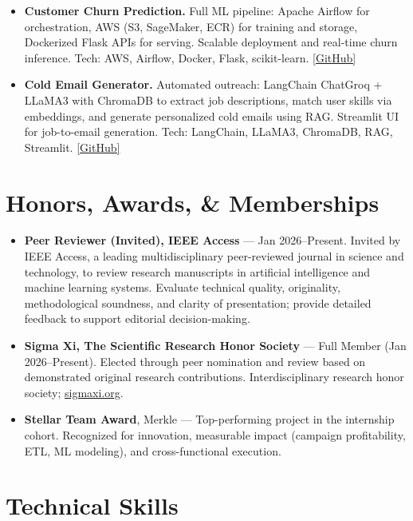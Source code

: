 \documentclass[11pt,a4paper]{article}
\newcommand{\cvItem}[1]{\item \small #1 \vspace{-1pt}}
\begin{document}
\begin{itemize}[leftmargin=*,nosep]
  \cvItem{\textbf{Customer Churn Prediction.} Full ML pipeline: Apache Airflow for orchestration, AWS (S3, SageMaker, ECR) for training and storage, Dockerized Flask APIs for serving. Scalable deployment and real-time churn inference. Tech: AWS, Airflow, Docker, Flask, scikit-learn. \href{https://github.com/aravinda-1402/Customer-Churn-Prediction}{[GitHub]}}
  \cvItem{\textbf{Cold Email Generator.} Automated outreach: LangChain ChatGroq + LLaMA3 with ChromaDB to extract job descriptions, match user skills via embeddings, and generate personalized cold emails using RAG. Streamlit UI for job-to-email generation. Tech: LangChain, LLaMA3, ChromaDB, RAG, Streamlit. \href{https://github.com/aravinda-1402/Cold_Email_Generator}{[GitHub]}}
\end{itemize}
\vspace{2pt}

\section{Honors, Awards, \& Memberships}

\begin{itemize}[leftmargin=*,nosep]
  \cvItem{\textbf{Peer Reviewer (Invited), IEEE Access} --- Jan 2026--Present. Invited by IEEE Access, a leading multidisciplinary peer-reviewed journal in science and technology, to review research manuscripts in artificial intelligence and machine learning systems. Evaluate technical quality, originality, methodological soundness, and clarity of presentation; provide detailed feedback to support editorial decision-making.}
  \cvItem{\textbf{Sigma Xi, The Scientific Research Honor Society} --- Full Member (Jan 2026--Present). Elected through peer nomination and review based on demonstrated original research contributions. Interdisciplinary research honor society; \href{https://www.sigmaxi.org/}{sigmaxi.org}.}
  \cvItem{\textbf{Stellar Team Award}, Merkle --- Top-performing project in the internship cohort. Recognized for innovation, measurable impact (campaign profitability, ETL, ML modeling), and cross-functional execution.}
\end{itemize}
\vspace{2pt}

\section{Technical Skills}
\end{document}
